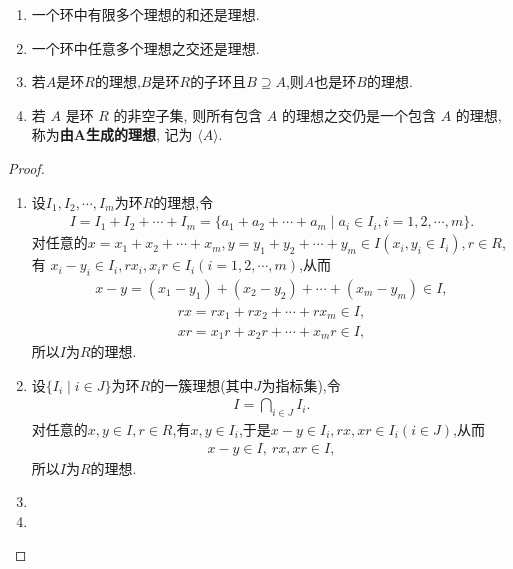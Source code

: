 \documentclass[../../main.tex]{subfiles}%
\begin{document}
\begin{theorem}\label{theorem:子环和理想的基本性质}
\begin{enumerate}[(1)]
\item 一个环中有限多个理想的和还是理想.

\item 一个环中任意多个理想之交还是理想.

\item\label{theorem:子环和理想的基本性质-2} 若$A$是环$R$的理想,$B$是环$R$的子环且$B\supseteq A$,则$A$也是环$B$的理想.

\item 若 \( A \) 是环 \( R \) 的非空子集, 则所有包含 \( A \) 的理想之交仍是一个包含 \( A \) 的理想, 称为\textbf{由\(\boldsymbol{A}\)生成的理想}, 记为 \( \langle A \rangle \).
\end{enumerate}
\end{theorem}
\begin{proof}
\begin{enumerate}[(1)]
\item 设$I_1,I_2,\cdots,I_m$为环$R$的理想,令
\begin{align*}
I = I_1 + I_2 + \cdots + I_m = \{a_1 + a_2 + \cdots + a_m \mid a_i \in I_i, i=1,2,\cdots,m\}.
\end{align*}
对任意的$x = x_1 + x_2 + \cdots + x_m, y = y_1 + y_2 + \cdots + y_m \in I(x_i,y_i \in I_i), r \in R$,有
$x_i - y_i \in I_i, rx_i, x_i r \in I_i(i=1,2,\cdots,m)$,从而
\begin{align*}
x - y = (x_1 - y_1) + (x_2 - y_2) + \cdots + (x_m - y_m) \in I,
\end{align*}
\begin{align*}
rx = rx_1 + rx_2 + \cdots + rx_m \in I,
\end{align*}
\begin{align*}
xr = x_1 r + x_2 r + \cdots + x_m r \in I,
\end{align*}
所以$I$为$R$的理想.

\item 设$\{I_i \mid i \in J\}$为环$R$的一簇理想(其中$J$为指标集),令
\begin{align*}
I = \bigcap_{i \in J}I_i.
\end{align*}
对任意的$x,y \in I, r \in R$,有$x,y \in I_i$,于是$x - y \in I_i, rx,xr \in I_i(i \in J)$,从而
\begin{align*}
x - y \in I,\ rx,xr \in I,
\end{align*}
所以$I$为$R$的理想.

\item 

\item 
\end{enumerate}
\end{proof}
\end{document}
